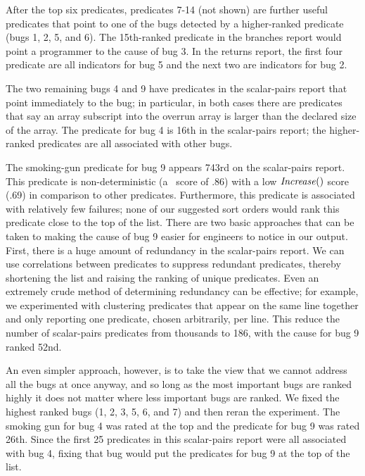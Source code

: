 After the top six predicates, predicates 7-14 (not shown) are further useful predicates that
point to one of the bugs detected by a higher-ranked predicate (bugs 1, 2, 5, and 6).  The 15th-ranked
predicate in the branches report would point a programmer to the cause of bug 3.  In the returns report,
the first four predicate are all indicators for bug 5 and the next two are indicators for bug 2.

The two remaining bugs 4 and 9 have predicates in the scalar-pairs report that point immediately to the
bug; in particular, in both cases there are predicates that say an array subscript into the overrun
array is larger than the declared size of the array.  The predicate for bug 4 is 16th
in the scalar-pairs report; the higher-ranked predicates are all associated with other bugs.  

The smoking-gun predicate
for bug 9 appears 743rd on the scalar-pairs report.  This predicate is non-deterministic (a \crash\ score of .86) with a 
low $\mbox{\textit{Increase}}()$ score (.69) in comparison to other predicates.  Furthermore, this predicate
 is associated with relatively few failures; none of our suggested sort
orders would rank this predicate close to the top of the list.  There are two basic approaches that can be taken
to making the cause of bug 9 easier for engineers to notice in our output.  First, there is
a huge amount of redundancy in the scalar-pairs report.  We can use correlations between predicates to suppress redundant
predicates, thereby shortening the list and raising the ranking of unique predicates.  Even an extremely crude method
of determining redundancy can be effective; for example, we experimented with clustering predicates that appear on the
same line together and only reporting one predicate, chosen arbitrarily, per line.  This reduce the number of scalar-pairs
predicates from thousands to 186, with the cause for bug 9 ranked 52nd.  

An even simpler approach, however, is to take the view that we cannot address all the bugs at once anyway, and so long
as the most important bugs are ranked highly it does not matter where less important bugs are ranked.  
We fixed the highest ranked bugs (1, 2, 3, 5, 6, and 7) and then reran the experiment.  The smoking gun for bug 4 was
rated at the top and the predicate for bug 9 was rated 26th.  Since the first 25 predicates in this scalar-pairs report
were all associated with bug 4, fixing that bug would put the predicates for bug 9 at the top of the list.


